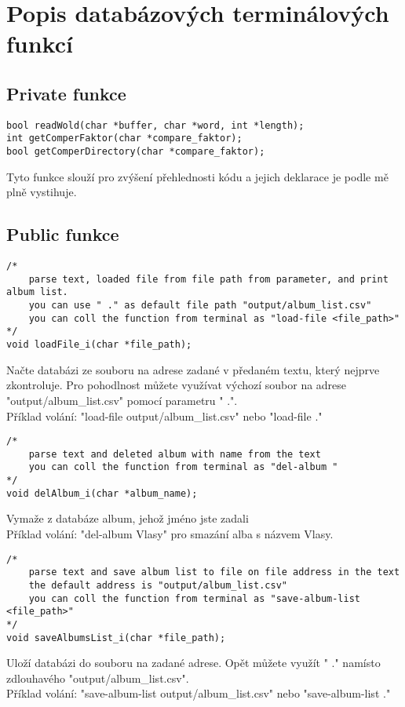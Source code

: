 \section{Popis databázových terminálových funkcí}
\subsection{Private funkce}

\begin{lstlisting}[style=CStyle]
bool readWold(char *buffer, char *word, int *length);
int getComperFaktor(char *compare_faktor);
bool getComperDirectory(char *compare_faktor);
\end{lstlisting}
Tyto funkce slouží pro zvýšení přehlednosti kódu a jejich deklarace je podle mě plně vystihuje.

\subsection{Public funkce}
\begin{lstlisting}[style=CStyle]
/*
    parse text, loaded file from file path from parameter, and print album list.
    you can use " ." as default file path "output/album_list.csv"
    you can coll the function from terminal as "load-file <file_path>"
*/
void loadFile_i(char *file_path);
\end{lstlisting}
Načte databázi ze souboru na adrese zadané v předaném textu, který nejprve zkontroluje.
Pro pohodlnost můžete využívat výchozí soubor na adrese "output/album\_list.csv" pomocí parametru " .".\\ 
Příklad volání: "load-file output/album\_list.csv" nebo "load-file ."

\begin{lstlisting}[style=CStyle]
/*
    parse text and deleted album with name from the text
    you can coll the function from terminal as "del-album "
*/
void delAlbum_i(char *album_name);
\end{lstlisting}
Vymaže z databáze album, jehož jméno jste zadali\\ 
Příklad volání: "del-album Vlasy" pro smazání alba s názvem Vlasy.

\begin{lstlisting}[style=CStyle]
/*
    parse text and save album list to file on file address in the text 
    the default address is "output/album_list.csv"
    you can coll the function from terminal as "save-album-list <file_path>"
*/
void saveAlbumsList_i(char *file_path);
\end{lstlisting}
Uloží databázi do souboru na zadané adrese.
Opět můžete využít " ." namísto zdlouhavého "output/album\_list.csv".\\ 
Příklad volání: "save-album-list output/album\_list.csv" nebo "save-album-list ."

